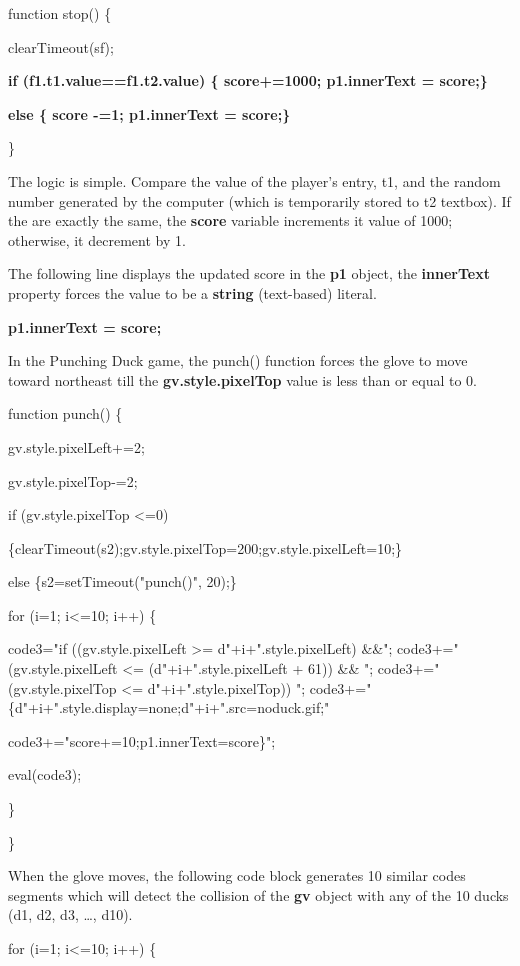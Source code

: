 \documentclass[
]{article}
\begin{document}
function stop() \{

clearTimeout(sf);

\textbf{if (f1.t1.value==f1.t2.value) \{ score+=1000; p1.innerText =
score;\}}

\textbf{else \{ score -=1; p1.innerText = score;\}}

\}

The logic is simple. Compare the value of the player's entry, t1, and
the random number generated by the computer (which is temporarily stored
to t2 textbox). If the are exactly the same, the \textbf{score} variable
increments it value of 1000; otherwise, it decrement by 1.

The following line displays the updated score in the \textbf{p1} object,
the \textbf{innerText} property forces the value to be a \textbf{string}
(text-based) literal.

\textbf{p1.innerText = score;}

In the Punching Duck game, the punch() function forces the glove to move
toward northeast till the \textbf{gv.style.pixelTop} value is less than
or equal to 0.

function punch() \{

gv.style.pixelLeft+=2;

gv.style.pixelTop-=2;

if (gv.style.pixelTop \textless=0)

\{clearTimeout(s2);gv.style.pixelTop=200;gv.style.pixelLeft=10;\}

else \{s2=setTimeout("punch()", 20);\}

for (i=1; i\textless=10; i++) \{

code3="if ((gv.style.pixelLeft \textgreater= d"+i+".style.pixelLeft)
\&\&"; code3+=" (gv.style.pixelLeft \textless= (d"+i+".style.pixelLeft +
61)) \&\& "; code3+=" (gv.style.pixelTop \textless=
d"+i+".style.pixelTop)) ";
code3+="\{d"+i+".style.display=\textquotesingle none\textquotesingle;d"+i+".src=\textquotesingle noduck.gif\textquotesingle;"

code3+="score+=10;p1.innerText=score\}";

eval(code3);

\}

\}

When the glove moves, the following code block generates 10 similar
codes segments which will detect the collision of the \textbf{gv} object
with any of the 10 ducks (d1, d2, d3, \ldots, d10).

for (i=1; i\textless=10; i++) \{
\end{document}
